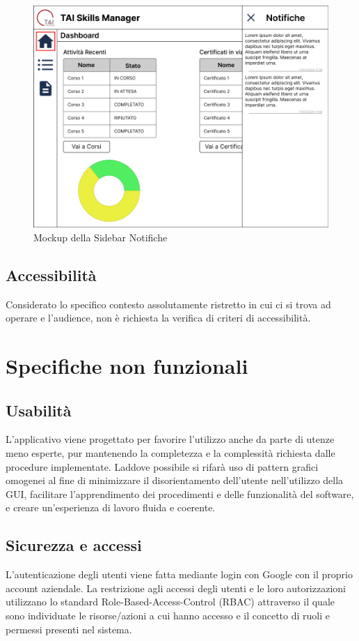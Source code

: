 \begin{figure}[ht!]  
    \centering
        \includegraphics[width=0.7\linewidth]{immagini/mockup/Notifiche aperte su Dashboard Membro del Team.png}
        \caption{Mockup della Sidebar Notifiche}
        \label{mockup-notifiche}
\end{figure}
\FloatBarrier


\subsection{Accessibilità}
Considerato lo specifico contesto assolutamente ristretto in cui ci si trova ad operare e l’audience, non è richiesta la verifica di criteri di accessibilità.

\section{Specifiche non funzionali}

\subsection{Usabilità}
L’applicativo viene progettato per favorire l’utilizzo anche da parte di utenze meno esperte, pur mantenendo la completezza e la complessità richiesta dalle procedure implementate. Laddove possibile si rifarà uso di pattern grafici omogenei al fine di minimizzare il disorientamento dell’utente nell’utilizzo della GUI, facilitare l’apprendimento dei procedimenti e delle funzionalità del software, e creare un’esperienza di lavoro fluida e coerente.
\subsection{Sicurezza e accessi}
L’autenticazione degli utenti viene fatta mediante login con Google con il proprio account aziendale. La restrizione agli accessi degli utenti e le loro autorizzazioni utilizzano lo standard Role-Based-Access-Control (RBAC) attraverso il quale sono individuate le risorse/azioni a cui hanno accesso e il concetto di ruoli e permessi presenti nel sistema.
